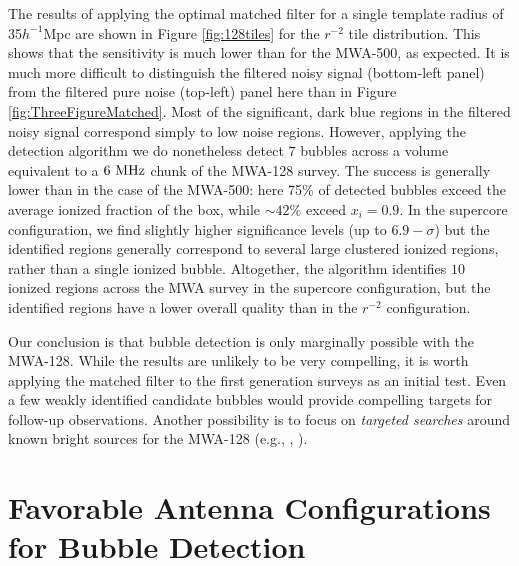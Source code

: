 The results of applying the optimal matched filter for a
single template radius of 35$h^{-1}$Mpc are shown in Figure
\ref{fig:128tiles} for the $r^{-2}$ tile distribution. This
shows that the sensitivity is much lower than for the MWA-500, as
expected. It is much more difficult to distinguish the filtered noisy
signal (bottom-left panel) from the filtered pure noise (top-left) panel here than in 
Figure \ref{fig:ThreeFigureMatched}. Most of the significant, dark blue regions in the filtered noisy
signal correspond simply to low noise regions. However, applying the detection algorithm
we do nonetheless detect $7$ bubbles across a volume equivalent to a $6 \ \text{MHz}$ chunk of the MWA-128 survey.
The success is generally lower than in the case of the MWA-500: here
75\% of detected bubbles exceed the average
ionized fraction of the box, while $\sim 42\%$ exceed $x_i =
0.9$. In the supercore configuration, we find slightly higher significance levels (up to $6.9-\sigma$)
but the identified regions generally correspond to several large clustered ionized regions,
rather than a single ionized bubble. Altogether, the algorithm identifies $10$ ionized regions
across the MWA survey in the supercore configuration, but the identified regions have a lower overall quality than
in the $r^{-2}$ configuration. 

Our conclusion is that bubble detection is only marginally possible with the MWA-128. While the results
are unlikely to be very compelling, it is worth applying the matched filter to the first generation
surveys as an initial test. Even a few weakly identified candidate bubbles would provide compelling targets for follow-up
observations. Another possibility is to focus on {\em targeted searches} around known bright
sources for the MWA-128 (e.g., \citealt{Wyithe:2004ta}, \citealt{Friedrich:2012fy}).



\section{Favorable Antenna Configurations for Bubble Detection} \label{sec:BubbleLOFAR}

